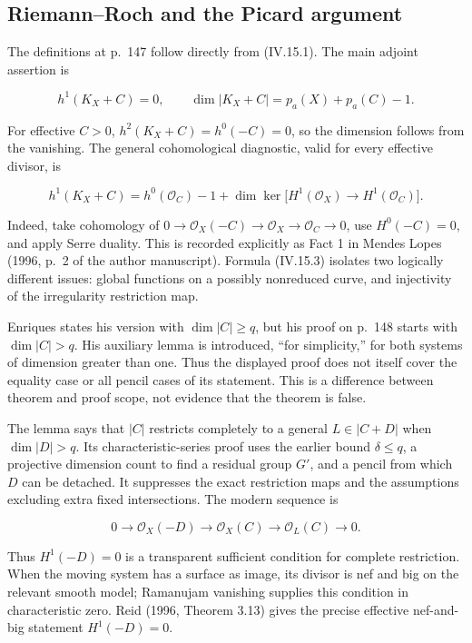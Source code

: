 \subsection{Riemann--Roch and the Picard argument}

The definitions at p.~147 follow directly from (IV.15.1). The main adjoint assertion is

\[
h^1(K_X+C)=0,\qquad \dim|K_X+C|=p_a(X)+p_a(C)-1.
\tag{IV.15.2}
\]

For effective \(C>0\), \(h^2(K_X+C)=h^0(-C)=0\), so the dimension follows from the vanishing. The general cohomological diagnostic, valid for every effective divisor, is

\[
h^1(K_X+C)
=h^0(\mathcal O_C)-1+
\dim\ker\bigl[H^1(\mathcal O_X)\longrightarrow H^1(\mathcal O_C)\bigr].
\tag{IV.15.3}
\]

Indeed, take cohomology of \(0\to\mathcal O_X(-C)\to\mathcal O_X\to\mathcal O_C\to0\), use \(H^0(-C)=0\), and apply Serre duality. This is recorded explicitly as Fact 1 in Mendes Lopes (1996, p.~2 of the author manuscript). Formula (IV.15.3) isolates two logically different issues: global functions on a possibly nonreduced curve, and injectivity of the irregularity restriction map.

Enriques states his version with \(\dim|C|\ge q\), but his proof on p.~148 starts with \(\dim|C|>q\). His auxiliary lemma is introduced, ``for simplicity,'' for both systems of dimension greater than one. Thus the displayed proof does not itself cover the equality case or all pencil cases of its statement. This is a difference between theorem and proof scope, not evidence that the theorem is false.

The lemma says that \(|C|\) restricts completely to a general \(L\in|C+D|\) when \(\dim|D|>q\). Its characteristic-series proof uses the earlier bound \(\delta\le q\), a projective dimension count to find a residual group \(G'\), and a pencil from which \(D\) can be detached. It suppresses the exact restriction maps and the assumptions excluding extra fixed intersections. The modern sequence is

\[
0\longrightarrow\mathcal O_X(-D)
\longrightarrow\mathcal O_X(C)
\longrightarrow\mathcal O_L(C)\longrightarrow0.
\tag{IV.15.4}
\]

Thus \(H^1(-D)=0\) is a transparent sufficient condition for complete restriction. When the moving system has a surface as image, its divisor is nef and big on the relevant smooth model; Ramanujam vanishing supplies this condition in characteristic zero. Reid (1996, Theorem 3.13) gives the precise effective nef-and-big statement \(H^1(-D)=0\).

